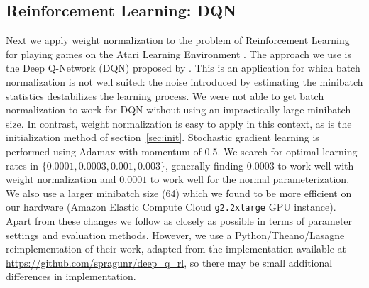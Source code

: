 \documentclass{article}
\begin{document}
\subsection{Reinforcement Learning: DQN}
Next we apply weight normalization to the problem of Reinforcement Learning for playing games on the Atari Learning Environment \cite{bellemare13arcade}. The approach we use is the Deep Q-Network (DQN) proposed by \cite{mnih2015human}. This is an application for which batch normalization is not well suited: the noise introduced by estimating the minibatch statistics destabilizes the learning process. We were not able to get batch normalization to work for DQN without using an impractically large minibatch size. In contrast, weight normalization is easy to apply in this context, as is the initialization method of section~\ref{sec:init}. Stochastic gradient learning is performed using Adamax \cite{kingma2014adam} with momentum of 0.5. We search for optimal learning rates in $\{0.0001, 0.0003, 0.001, 0.003\}$, generally finding $0.0003$ to work well with weight normalization and $0.0001$ to work well for the normal parameterization. We also use a larger minibatch size (64) which we found to be more efficient on our hardware (Amazon Elastic Compute Cloud \texttt{g2.2xlarge} GPU instance). Apart from these changes we follow \cite{mnih2015human} as closely as possible in terms of parameter settings and evaluation methods. However, we use a Python/Theano/Lasagne reimplementation of their work, adapted from the implementation available at \url{https://github.com/spragunr/deep_q_rl}, so there may be small additional differences in implementation.
\end{document}
